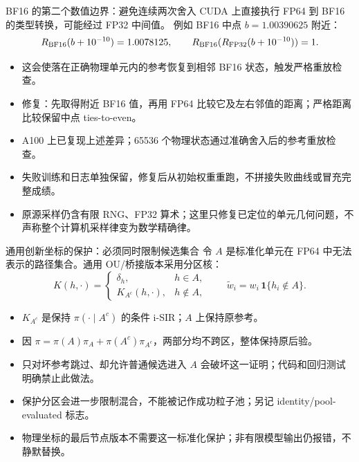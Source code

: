 \documentclass[10pt,aspectratio=169]{beamer}
\begin{document}
\begin{frame}{BF16 的第二个数值边界：避免连续两次舍入}
\small
CUDA 上直接执行 FP64 到 BF16 的类型转换，可能经过 FP32 中间值。
例如 BF16 中点 $b=1.00390625$ 附近：
\begin{equation}
R_{\rm BF16}(b+10^{-10})=1.0078125,
\qquad R_{\rm BF16}(R_{\rm FP32}(b+10^{-10}))=1.
\end{equation}
\begin{itemize}\itemsep5pt
\item 这会使落在正确物理单元内的参考恢复到相邻 BF16 状态，触发严格重放检查。
\item 修复：先取得附近 BF16 值，再用 FP64 比较它及左右邻值的距离；严格距离比较保留中点 ties-to-even。
\item A100 上已复现上述差异；65536 个物理状态通过准确舍入后的参考重放检查。
\item 失败训练和日志单独保留，修复后从初始权重重跑，不拼接失败曲线或冒充完整成绩。
\item 原源采样仍含有限 RNG、FP32 算术；这里只修复已定位的单元几何问题，不声称整个计算机采样律变为数学精确律。
\end{itemize}
\end{frame}

\begin{frame}{通用创新坐标的保护：必须同时限制候选集合}
\small
令 $A$ 是标准化单元在 FP64 中无法表示的路径集合。通用 OU/桥接版本采用分区核：
\begin{equation}
K(h,\cdot)=\begin{cases}\delta_h,&h\in A,\\
K_{A^c}(h,\cdot),&h\notin A,
\end{cases}\qquad
\widetilde w_i=w_i\,\mathbf1\{h_i\notin A\}.
\end{equation}
\begin{itemize}\itemsep5pt
\item $K_{A^c}$ 是保持 $\pi(\cdot\mid A^c)$ 的条件 i-SIR；$A$ 上保持原参考。
\item 因 $\pi=\pi(A)\pi_A+\pi(A^c)\pi_{A^c}$，两部分均不跨区，整体保持原后验。
\item 只对坏参考跳过、却允许普通候选进入 $A$ 会破坏这一证明；代码和回归测试明确禁止此做法。
\item 保护分区会进一步限制混合，不能被记作成功粒子池；另记 identity/pool-evaluated 标志。
\item 物理坐标的最后节点版本不需要这一标准化保护；非有限模型输出仍报错，不静默替换。
\end{itemize}
\end{frame}
\end{document}
